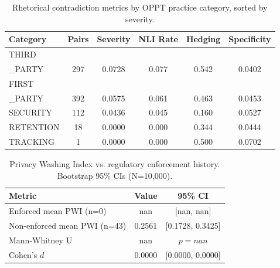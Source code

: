 \begin{table}[t]
\centering
\caption{Rhetorical contradiction metrics by OPPT practice category, sorted by severity.}
\label{tab:categories}
\begin{tabular}{lccccc}
\toprule
Category & Pairs & Severity & NLI Rate & Hedging & Specificity \\
\midrule
THIRD\\_PARTY & 297 & 0.0728 & 0.077 & 0.542 & 0.0402 \\
FIRST\\_PARTY & 392 & 0.0575 & 0.061 & 0.463 & 0.0453 \\
SECURITY & 112 & 0.0436 & 0.045 & 0.160 & 0.0527 \\
RETENTION & 18 & 0.0000 & 0.000 & 0.344 & 0.0444 \\
TRACKING & 1 & 0.0000 & 0.000 & 0.500 & 0.0702 \\
\bottomrule
\end{tabular}
\end{table}

\begin{table}[t]
\centering
\caption{Privacy Washing Index vs. regulatory enforcement history. Bootstrap 95\% CIs (N=10,000).}
\label{tab:enforcement}
\begin{tabular}{lcc}
\toprule
Metric & Value & 95\% CI \\
\midrule
Enforced mean PWI (n=0) & nan & [nan, nan] \\
Non-enforced mean PWI (n=43) & 0.2561 & [0.1728, 0.3425] \\
Mann-Whitney U & nan & $p=nan$ \\
Cohen's $d$ & 0.0000 & [0.0000, 0.0000] \\
\bottomrule
\end{tabular}
\end{table}